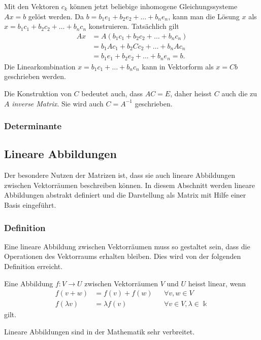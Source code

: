 Mit den Vektoren $c_k$ können jetzt beliebige inhomogene Gleichungssysteme
$Ax=b$ gelöst werden.
Da $b = b_1e_1 + b_2e_2 + \dots + b_ne_n$, kann man die Lösung $x$ als
$x = b_1c_1+b_2c_2+\dots+b_nc_n$ konstruieren.
Tatsächlich gilt
\begin{align*}
Ax
&= 
A( b_1c_1+b_2c_2+\dots+b_nc_n)
\\
&=
b_1Ac_1 + b_2Cc_2 + \dots + b_nAc_n
\\
&=
b_1e_1 + b_2e_2 + \dots + b_ne_n
=
b.
\end{align*}
Die Linearkombination $x=b_1c_1+\dots+b_nc_n$ kann in Vektorform als $x=Cb$
geschrieben werden.

Die Konstruktion von $C$ bedeutet auch, dass $AC=E$, daher heisst $C$ auch
die zu $A$ {\em inverse Matrix}.
Sie wird auch $C=A^{-1}$ geschrieben.

\subsubsection{Determinante}

%
%
\subsection{Lineare Abbildungen
\label{buch:grundlagen:subsection:lineare-abbildungen}}
Der besondere Nutzen der Matrizen ist, dass sie auch lineare Abbildungen
zwischen Vektorräumen beschreiben können.
In diesem Abschnitt werden lineare Abbildungen abstrakt definiert
und die Darstellung als Matrix mit Hilfe einer Basis eingeführt.


\subsubsection{Definition}
Eine lineare Abbildung zwischen Vektorräumen muss so gestaltet sein,
dass die Operationen des Vektorraums erhalten bleiben.
Dies wird von der folgenden Definition erreicht.

\begin{definition}
Eine Abbildung $f\colon V\to U$ zwischen Vektorräumen $V$ und $U$
heisst linear, wenn
\[
\begin{aligned}
f(v+w) &= f(v) + f(w)&&\forall v,w\in V 
\\
f(\lambda v) &= \lambda f(v) &&\forall v\in V,\lambda \in \Bbbk
\end{aligned}
\]
gilt.
\end{definition}

Lineare Abbildungen sind in der Mathematik sehr verbreitet.

